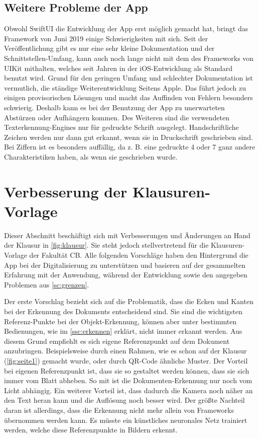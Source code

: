 \documentclass[notables, nomenclature, oneside, 150]{HSMW-Thesis}
\begin{document}
		\subsection{Weitere Probleme der App}
			Obwohl SwiftUI die Entwicklung der App erst möglich gemacht hat, bringt das Framework von Juni 2019 einige Schwierigkeiten mit sich. Seit der Veröffentlichung gibt es nur eine sehr kleine Dokumentation und der Schnittstellen-Umfang, kann auch noch lange nicht mit dem des Frameworks von UIKit mithalten, welches seit Jahren in der iOS-Entwicklung als Standard benutzt wird. Grund für den geringen Umfang und schlechter Dokumentation ist vermutlich, die ständige Weiterentwicklung Seitens Apple. Das führt jedoch zu einigen provisorischen Lösungen und macht das Auffinden von Fehlern besonders schwierig. Deshalb kann es bei der Benutzung der App zu unerwarteten Abstürzen oder Aufhängern kommen. Des Weiteren sind die verwendeten Texterkennung-Engines nur für gedruckte Schrift ausgelegt. Handschriftliche Zeichen werden nur dann gut erkannt, wenn sie in Druckschrift geschrieben sind. Bei Ziffern ist es besonders auffällig, da z. B. eine gedruckte 4 oder 7 ganz andere Charakteristiken haben, als wenn sie geschrieben wurde.
	

	\section{Verbesserung der Klausuren-Vorlage}\label{sc:vorlage}
		Dieser Abschnitt beschäftigt sich mit Verbesserungen und Änderungen an Hand der Klausur in \autoref{fig:klausur}. Sie steht jedoch stellvertretend für die Klausuren-Vorlage der Fakultät CB. Alle folgenden Vorschläge haben den Hintergrund die App bei der Digitalisierung zu unterstützen und basieren auf der gesammelten Erfahrung mit der Anwendung, während der Entwicklung sowie den angegeben Problemen aus \autoref{sc:grenzen}.
	
		Der erste Vorschlag bezieht sich auf die Problematik, dass die Ecken und Kanten bei der Erkennung des Dokuments entscheidend sind. Sie sind die wichtigsten Referenz-Punkte bei der Objekt-Erkennung, können aber unter bestimmten Bedienungen, wie im \autoref{ssc:erkennen} erklärt, nicht immer erkannt werden. Aus diesem Grund empfiehlt es sich eigene Referenzpunkt auf dem Dokument anzubringen. Beispielsweise durch einen Rahmen, wie es schon auf der Klausur (\ref{fig:seite1}) gemacht wurde, oder durch QR-Code ähnliche Muster. Der Vorteil bei eigenen Referenzpunkt ist, dass sie so gestaltet werden können, dass sie sich immer vom Blatt abheben. So mit ist die Dokumenten-Erkennung nur noch vom Licht abhängig. Ein weiterer Vorteil ist, dass dadurch die Kamera noch näher an den Text heran kann und die Auflösung noch besser wird. Der größte Nachteil daran ist allerdings, dass die Erkennung nicht mehr allein von Frameworks übernommen werden kann. Es müsste ein künstliches neuronales Netz trainiert werden, welche diese Referenzpunkte in Bildern erkennt. 
	
\end{document}
